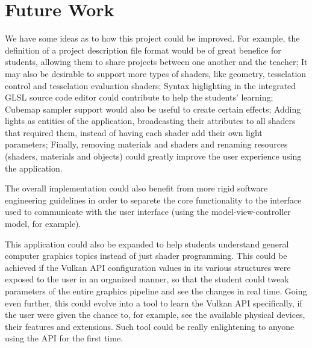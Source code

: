 \section{Future Work}
We have some ideas as to how this project could be improved. For example, the definition of a project description file format would be of great benefice for students, allowing them to share projects between one another and the teacher; It may also be desirable to support more types of shaders, like geometry, tesselation control and tesselation evaluation shaders; Syntax higlighting in the integrated GLSL source code editor could contribute to help the students' learning;  Cubemap sampler support would also be useful to create certain effects; Adding lights as entities of the application, broadcasting their attributes to all shaders that required them, instead of having each shader add their own light parameters; Finally, removing materials and shaders and renaming resources (shaders, materials and objects) could greatly improve the user experience using the application.

The overall implementation could also benefit from more rigid software engineering guidelines in order to separete the core functionality to the interface used to communicate with the user interface (using the model-view-controller model, for example).

This application could also be expanded to help students understand general computer graphics topics instead of just shader programming. This could be achieved if the Vulkan API configuration values in its various structures were exposed to the user in an organized manner, so that the student could tweak parameters of the entire graphics pipeline and see the changes in real time. Going even further, this could evolve into a tool to learn the Vulkan API specifically, if the user were given the chance to, for example, see the available physical devices, their features and extensions. Such tool could be really enlightening to anyone using the API for the first time.
